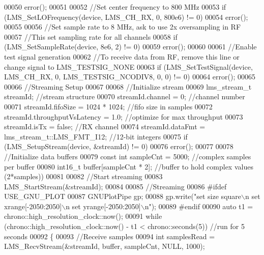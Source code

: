 \begin{DoxyCode}
00050         error();
00051 
00052     \textcolor{comment}{//Set center frequency to 800 MHz}
00053     \textcolor{keywordflow}{if} (LMS_SetLOFrequency(device, LMS_CH_RX, 0, 800e6) != 0)
00054         error();
00055 
00056     \textcolor{comment}{//Set sample rate to 8 MHz, ask to use 2x oversampling in RF}
00057     \textcolor{comment}{//This set sampling rate for all channels}
00058     \textcolor{keywordflow}{if} (LMS_SetSampleRate(device, 8e6, 2) != 0)
00059         error();
00060 
00061     \textcolor{comment}{//Enable test signal generation}
00062     \textcolor{comment}{//To receive data from RF, remove this line or change signal to LMS\_TESTSIG\_NONE}
00063     \textcolor{keywordflow}{if} (LMS_SetTestSignal(device, LMS_CH_RX, 0, LMS_TESTSIG_NCODIV8, 0, 0) != 0)
00064         error();
00065 
00066     \textcolor{comment}{//Streaming Setup}
00067 
00068     \textcolor{comment}{//Initialize stream}
00069     lms_stream_t streamId; \textcolor{comment}{//stream structure}
00070     streamId.channel = 0; \textcolor{comment}{//channel number}
00071     streamId.fifoSize = 1024 * 1024; \textcolor{comment}{//fifo size in samples}
00072     streamId.throughputVsLatency = 1.0; \textcolor{comment}{//optimize for max throughput}
00073     streamId.isTx = \textcolor{keyword}{false}; \textcolor{comment}{//RX channel}
00074     streamId.dataFmt = lms_stream_t::LMS_FMT_I12; \textcolor{comment}{//12-bit integers}
00075     \textcolor{keywordflow}{if} (LMS_SetupStream(device, &streamId) != 0)
00076         error();
00077 
00078     \textcolor{comment}{//Initialize data buffers}
00079     \textcolor{keyword}{const} \textcolor{keywordtype}{int} sampleCnt = 5000; \textcolor{comment}{//complex samples per buffer}
00080     int16\_t buffer[sampleCnt * 2]; \textcolor{comment}{//buffer to hold complex values (2*samples))}
00081 
00082     \textcolor{comment}{//Start streaming}
00083     LMS_StartStream(&streamId);
00084 
00085     \textcolor{comment}{//Streaming}
00086 \textcolor{preprocessor}{#ifdef USE\_GNU\_PLOT}
00087     GNUPlotPipe gp;
00088     gp.write(\textcolor{stringliteral}{"set size square\(\backslash\)n set xrange[-2050:2050]\(\backslash\)n set yrange[-2050:2050]\(\backslash\)n"});
00089 \textcolor{preprocessor}{#endif}
00090     \textcolor{keyword}{auto} t1 = chrono::high\_resolution\_clock::now();
00091     \textcolor{keywordflow}{while} (chrono::high\_resolution\_clock::now() - t1 < chrono::seconds(5)) \textcolor{comment}{//run for 5 seconds}
00092     \{
00093         \textcolor{comment}{//Receive samples}
00094         \textcolor{keywordtype}{int} samplesRead = LMS_RecvStream(&streamId, buffer, sampleCnt, NULL, 1000);

\end{DoxyCode}
